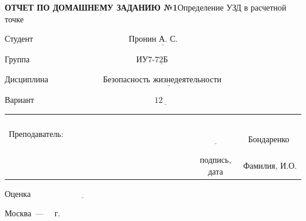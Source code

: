 \begin{titlepage}
	
	\begin{center}
		\noindent\begin{minipage}{1.2\textwidth}\centering
			\textbf{ОТЧЕТ ПО ДОМАШНЕМУ ЗАДАНИЮ №1}\newline Определение УЗД в расчетной точке \newline\newline
		\end{minipage}
	\end{center}

	\noindent Студент $\underline{\text{~~~~~~~~~~~~~~~~~~~~~~~~~~~~~~~~~~Пронин  А. С.~~~~~~~~~~~~~~~~~~~~~~~~~~~~~~~~~~~~~~~~~}}$
	
	\noindent Группа $\underline{\text{~~~~~~~~~~~~~~~~~~~~~~~~~~~~~~~~~~~~~~ИУ7-72Б~~~~~~~~~~~~~~~~~~~~~~~~~~~~~~~~~~~~~~~~~~~~~}}$
	
	\noindent Дисциплина $\underline{\text{~~~~~~~~~~~~~~~~~~~Безопасность жизнедеятельности~~~~~~~~~~~~~~~~~~~~~~~~}}$\
	
	\noindent Вариант $\underline{\text{~~~~~~~~~~~~~~~~~~~~~~~~~~~~~~~~~~~~~~~~~~~12~~~~~~~~~~~~~~~~~~~~~~~~~~~~~~~~~~~~~~~~~~~~~~~~}}$\newline
	
	
	\noindent\begin{tabular}{lcc}
		&&\\
		&&\\
		&&\\
		&&\\
		Преподаватель: ~~~~~~~~~~~~~~~~~~~~~~~~~~~~~~~~~~~~~~~& $\underline{\text{~~~~~~~~~~~~}}$ & $\underline{\text{~~Бондаренко А.В.~~}}$ \\
		& \footnotesize подпись, дата & \footnotesize Фамилия, И.О. \\
	\end{tabular}
	\newline\newline\newline
	\noindent Оценка $\underline{\text{~~~~~~~~~~~~~~~~~~~~~~~~~~~~~~~~~~~~}}$
	
	
	\begin{center}
		\vfill
		Москва~---~\the\year
		~г.
	\end{center}
 \restoregeometry
\end{titlepage}
